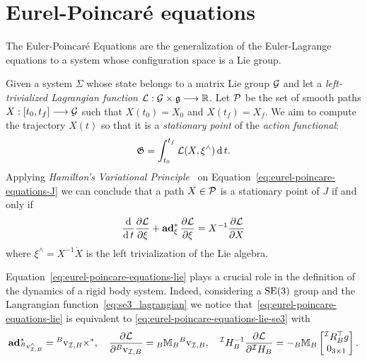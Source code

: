 \section{Eurel-Poincar\'e equations}
The Euler-Poincar\'e Equations are the generalization of the Euler-Lagrange equations to a system whose configuration space is a Lie group.
\par
Given a system $\Sigma$ whose state belongs to a matrix Lie group $\mathcal{G}$ and let a \emph{left-trivialized Lagrangian function} $\mathcal{L}: \mathcal{G} \times \mathfrak{g} \longrightarrow \mathbb{R}$. Let $\mathcal{P}$ be the set of smooth paths $X:[t_0, t_f] \longrightarrow \mathcal{G}$ such that $X(t_0) = X_0$ and $X(t_f) = X_f$. We aim to compute the trajectory $X(t)$ so that it is a \emph{stationary point} of the \emph{action functional}:
\begin{equation}
\label{eq:eurel-poincare-equations-J}
    \mathfrak{G} =\int_{t_0}^{t_f} \mathcal{L}(X, \xi^\wedge) \operatorname{d} t.
\end{equation}
Applying \emph{Hamilton’s Variational Principle}~\citep{Lee2018GlobalManifolds} on Equation~\eqref{eq:eurel-poincare-equations-J} we can conclude that 
a path $X \in \mathcal{P}$ is a stationary point of $J$ if and only if 
\begin{equation}
\label{eq:eurel-poincare-equations-lie}
    \frac{\operatorname{d} }{\operatorname{d} t} \frac{\partial \mathcal{L}}{\partial \xi} + \operatorname{\mathbf{ad}}^*_\xi \frac{\partial \mathcal{L}}{\partial \xi}  = X^{-1} \frac{\partial \mathcal{L}}{\partial X} 
\end{equation}
where $\xi^\wedge = X^{-1} \dot{X}$ is the left trivialization of the Lie algebra.
\par
Equation~\eqref{eq:eurel-poincare-equations-lie} plays a crucial role in the definition of the dynamics of a rigid body system. Indeed, considering a ${\mathrm{SE}}(3)$ group and the Langrangian function~\eqref{eq:se3_lagrangian} we notice that~\eqref{eq:eurel-poincare-equations-lie} is equivalent to \eqref{eq:eurel-poincare-equations-lie-se3}
with 
\begin{equation}
    \operatorname{\mathbf{ad}}^*_{{}^B \mathrm{v} _{\mathcal{I}, B }^\wedge} = {}^B \mathrm{v} _{\mathcal{I}, B } \times ^*, \quad \frac{\partial \mathcal{L}}{\partial {}^B \mathrm{v} _{\mathcal{I}, B } } = {}_B \mathbb{M} _ B {}^B \mathrm{v} _{\mathcal{I}, B }, \quad {}^{\mathcal{I}} H _ B ^ {-1} \frac{\partial \mathcal{L}}{\partial {}^{\mathcal{I}} H _ B} = - {}_B \mathbb{M} _ B \begin{bmatrix}
      {}^{\mathcal{I}} R _ B ^\top g \\ 
      0_{3\times1}
     \end{bmatrix}.
\end{equation}

